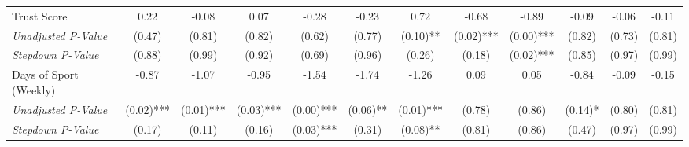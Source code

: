 \begin{tabular}{l c c c c c c c c c c c}
Trust Score & 0.22 & -0.08 & 0.07 & -0.28 & -0.23 & 0.72 & -0.68 & -0.89 & -0.09 & -0.06 & -0.11 \\
\quad \textit{Unadjusted P-Value} & (0.47) & (0.81) & (0.82) & (0.62) & (0.77) & (0.10)** & (0.02)*** & (0.00)*** & (0.82) & (0.73) & (0.81) \\
\quad \textit{Stepdown P-Value} & (0.88) & (0.99) & (0.92) & (0.69) & (0.96) & (0.26) & (0.18) & (0.02)*** & (0.85) & (0.97) & (0.99) \\
Days of Sport (Weekly) & -0.87 & -1.07 & -0.95 & -1.54 & -1.74 & -1.26 & 0.09 & 0.05 & -0.84 & -0.09 & -0.15 \\
\quad \textit{Unadjusted P-Value} & (0.02)*** & (0.01)*** & (0.03)*** & (0.00)*** & (0.06)** & (0.01)*** & (0.78) & (0.86) & (0.14)* & (0.80) & (0.81) \\
\quad \textit{Stepdown P-Value} & (0.17) & (0.11) & (0.16) & (0.03)*** & (0.31) & (0.08)** & (0.81) & (0.86) & (0.47) & (0.97) & (0.99) \\
\bottomrule
\end{tabular}
